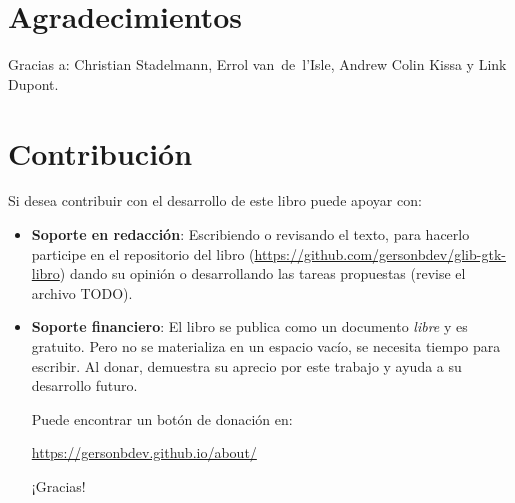 \section{Agradecimientos}
    Gracias a: Christian Stadelmann, Errol van~de~l'Isle, Andrew Colin Kissa y Link Dupont.

\newpage


\section{Contribución}

    Si desea contribuir con el desarrollo de este libro puede apoyar con:
    
    \begin{itemize}
        \item \textbf{Soporte en redacción}: Escribiendo o revisando el texto, para hacerlo participe en el repositorio del libro (\url{https://github.com/gersonbdev/glib-gtk-libro}) dando su opinión o desarrollando las tareas propuestas (revise el archivo TODO).
        
        \item \textbf{Soporte financiero}: El libro se publica como un documento \emph{libre} y es gratuito. Pero no se materializa en un espacio vacío, se necesita tiempo para escribir. Al donar, demuestra su aprecio por este trabajo y ayuda a su desarrollo futuro.
        
        Puede encontrar un botón de donación en:
    
        \url{https://gersonbdev.github.io/about/}
        
        ¡Gracias!
    \end{itemize}
    
    
    